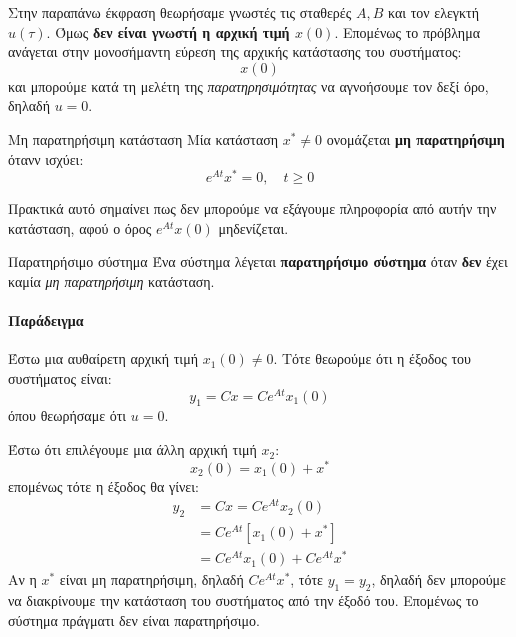 \documentclass[11pt,a4paper,notitlepage,fleqn]{article}
\begin{document}
Στην παραπάνω έκφραση θεωρήσαμε γνωστές τις σταθερές \( A,B \) και
τον ελεγκτή \( u(τ) \). Όμως \textbf{δεν είναι γνωστή η αρχική τιμή
	\( x(0) \)}. Επομένως το πρόβλημα ανάγεται στην μονοσήμαντη
εύρεση της αρχικής κατάστασης του συστήματος:
\[
x(0)
\]
και μπορούμε κατά τη μελέτη της \textit{παρατηρησιμότητας} να αγνοήσουμε
τον δεξί όρο, δηλαδή \( u=0 \).

\begin{defn}{Μη παρατηρήσιμη κατάσταση}{}
	Μία κατάσταση \( x^* \neq 0 \) ονομάζεται \textbf{μη παρατηρήσιμη}
	ότανν ισχύει:
	\[
	e^{At} x^* = 0,\quad t\geq 0
	\]
\end{defn}

Πρακτικά αυτό σημαίνει πως δεν μπορούμε να εξάγουμε πληροφορία από
αυτήν την κατάσταση, αφού ο όρος \( e^{At}x(0) \) μηδενίζεται.

\begin{defn}{Παρατηρήσιμο σύστημα}{}
	Ένα σύστημα λέγεται \textbf{παρατηρήσιμο σύστημα} όταν \textbf{δεν} έχει
	καμία \textit{μη παρατηρήσιμη} κατάσταση.
\end{defn}

\paragraph{Παράδειγμα}
Έστω μια αυθαίρετη αρχική τιμή \( x_1(0) \neq 0 \).
Τότε θεωρούμε ότι η έξοδος του συστήματος είναι:
\[
y_1 = Cx = Ce^{At} x_1(0)
\]
όπου θεωρήσαμε ότι \( u=0 \).

Έστω ότι επιλέγουμε μια άλλη αρχική τιμή \( x_2 \):
\[
x_2(0) = x_1(0) + x^*
\]
επομένως τότε η έξοδος θα γίνει:
\begin{align*}
	y_2 &= Cx = Ce^{At}x_2(0) \\
	&= Ce^{At}\left[ x_1(0) + x^* \right]
	\\ &= Ce^{At}x_1(0) + Ce^{At}x^*
\end{align*}
Αν η \( x^* \) είναι μη παρατηρήσιμη, δηλαδή \( Ce^{At}x^* \), τότε
\( y_1 = y_2 \), δηλαδή δεν μπορούμε να διακρίνουμε την κατάσταση του
συστήματος από την έξοδό του. Επομένως το σύστημα πράγματι δεν είναι
παρατηρήσιμο.
\end{document}
